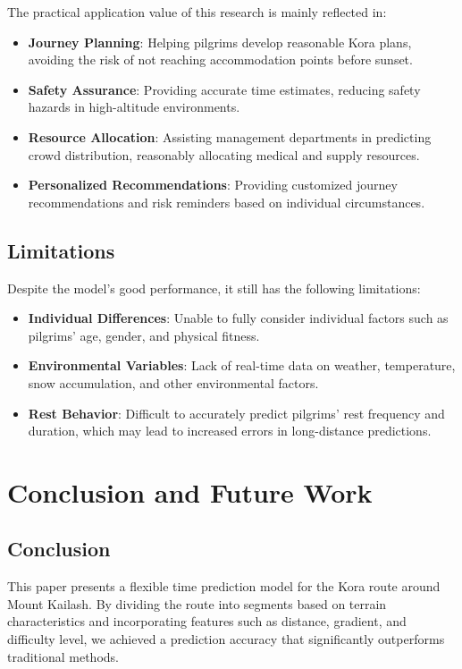 \documentclass[12pt]{article}
\begin{document}
The practical application value of this research is mainly reflected in:

\begin{itemize}
  \item \textbf{Journey Planning}: Helping pilgrims develop reasonable Kora plans, avoiding the risk of not reaching accommodation points before sunset.
  \item \textbf{Safety Assurance}: Providing accurate time estimates, reducing safety hazards in high-altitude environments.
  \item \textbf{Resource Allocation}: Assisting management departments in predicting crowd distribution, reasonably allocating medical and supply resources.
  \item \textbf{Personalized Recommendations}: Providing customized journey recommendations and risk reminders based on individual circumstances.
\end{itemize}

\subsection{Limitations}

Despite the model's good performance, it still has the following limitations:

\begin{itemize}
  \item \textbf{Individual Differences}: Unable to fully consider individual factors such as pilgrims' age, gender, and physical fitness.
  \item \textbf{Environmental Variables}: Lack of real-time data on weather, temperature, snow accumulation, and other environmental factors.
  \item \textbf{Rest Behavior}: Difficult to accurately predict pilgrims' rest frequency and duration, which may lead to increased errors in long-distance predictions.  
\end{itemize}

\section{Conclusion and Future Work}

\subsection{Conclusion}

This paper presents a flexible time prediction model for the Kora route around Mount Kailash. By dividing the route into segments based on terrain characteristics and incorporating features such as distance, gradient, and difficulty level, we achieved a prediction accuracy that significantly outperforms traditional methods.
\end{document}
